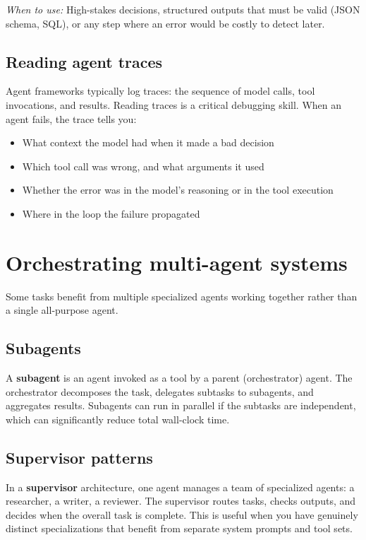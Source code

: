 \emph{When to use:} High-stakes decisions, structured outputs that must be valid (JSON schema, SQL), or any step where an error would be costly to detect later.

\subsection{Reading agent traces}

Agent frameworks typically log traces: the sequence of model calls, tool invocations, and results. Reading traces is a critical debugging skill. When an agent fails, the trace tells you:

\begin{itemize}[noitemsep,topsep=0pt]
  \item What context the model had when it made a bad decision
  \item Which tool call was wrong, and what arguments it used
  \item Whether the error was in the model's reasoning or in the tool execution
  \item Where in the loop the failure propagated
\end{itemize}

\section{Orchestrating multi-agent systems}

Some tasks benefit from multiple specialized agents working together rather than a single all-purpose agent.

\subsection{Subagents}

A \textbf{subagent} is an agent invoked as a tool by a parent (orchestrator) agent. The orchestrator decomposes the task, delegates subtasks to subagents, and aggregates results. Subagents can run in parallel if the subtasks are independent, which can significantly reduce total wall-clock time.

\subsection{Supervisor patterns}

In a \textbf{supervisor} architecture, one agent manages a team of specialized agents: a researcher, a writer, a reviewer. The supervisor routes tasks, checks outputs, and decides when the overall task is complete. This is useful when you have genuinely distinct specializations that benefit from separate system prompts and tool sets.

